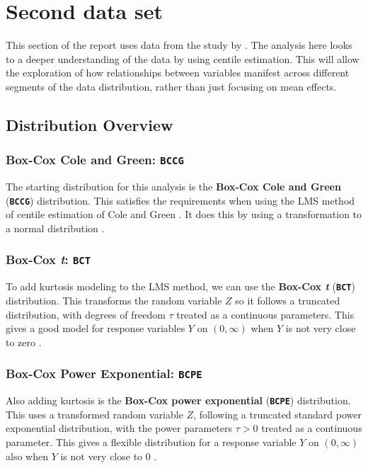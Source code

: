 \section{Second data set}

This section of the report uses data from the study  by \citeauthor{Cohen:2010}
\citeyear{Cohen:2010} \cite{Cohen:2010}.  The analysis here looks to a deeper understanding of the
data by using centile estimation.  This will allow the exploration of how relationships between
variables manifest across different segments of the data distribution, rather than just focusing on
mean effects.

\subsection{Distribution Overview}

\subsubsection{Box-Cox Cole and Green: \texttt{BCCG}}
The starting  distribution for this analysis is the \textbf{Box-Cox Cole and Green} (\textbf{\texttt{BCCG}}) distribution.  This satisfies
the requirements when using the LMS method of centile estimation of Cole and Green \cite{Rigby:2019}.  It does this by using a transformation
to a normal distribution \citeauthor{Box:1964} \cite{Box:1964}.

\subsubsection{Box-Cox \emph{t}: \texttt{BCT}}

To add kurtosis modeling to the LMS method, we can use the \textbf{Box-Cox \emph{t}} (\textbf{\texttt{BCT}}) distribution.  This transforms the
random variable $Z$ so it follows a truncated distribution, with degrees of freedom $\tau$ treated as a continuous parameters.
This gives a good model for response variables $Y$ on $(0, \infty)$ when $Y$ is not very close to zero \cite{Rigby:2019}.

\subsubsection{Box-Cox Power Exponential: \texttt{BCPE}}

Also adding kurtosis is the \textbf{Box-Cox power exponential} (\textbf{\texttt{BCPE}}) distribution.  This uses a
transformed random variable $Z$, following a truncated standard power exponential distribution, with the power parameters $\tau > 0$
treated as a continuous parameter.  This gives a flexible distribution for a response variable $Y$ on $(0, \infty)$ also when $Y$ is not very
close to $0$ \cite{Rigby:2019}. 

